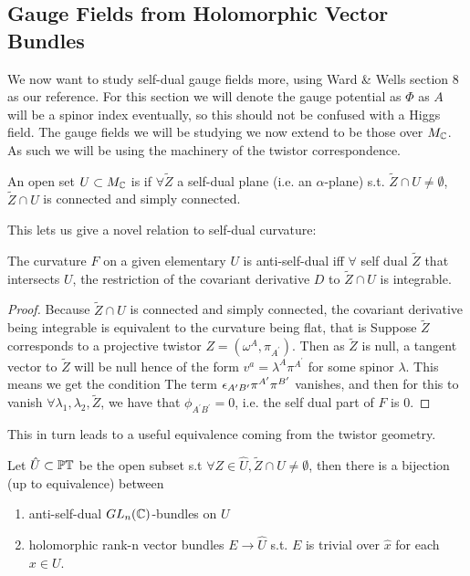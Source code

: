 \documentclass{article}
\begin{document}
\subsection{Gauge Fields from Holomorphic Vector Bundles}
We now want to study self-dual gauge fields more, using Ward \& Wells section 8 as our reference. For this section we will denote the gauge potential as $\Phi$ as $A$ will be a spinor index eventually, so this should not be confused with a Higgs field. The gauge fields we will be studying we now extend to be those over $M_{\mathbb{C}}$. As such we will be using the machinery of the twistor correspondence. 
\begin{definition}
	An open set $U \subset M_{\mathbb{C}}$ is  if $\forall \tilde{Z}$ a self-dual plane (i.e. an $\alpha$-plane) s.t. $\tilde{Z} \cap U \neq \emptyset$, $\tilde{Z} \cap U$ is connected and simply connected. 
\end{definition}
This lets us give a novel relation to self-dual curvature:
\begin{prop}
	The curvature $F$ on a given elementary $U$ is anti-self-dual iff $\forall$ self dual $\tilde{Z}$ that intersects $U$, the restriction of the covariant derivative $D$ to $\tilde{Z} \cap U$ is integrable. 
\end{prop}
\begin{proof}
	Because $\tilde{Z} \cap U$ is connected and simply connected, the covariant derivative being integrable is equivalent to the curvature being flat, that is 
Suppose $\tilde{Z}$ corresponds to a projective twistor $Z = (\omega^A, \pi_{A^\prime})$. Then as $\tilde{Z}$ is null, a tangent vector to $\tilde{Z}$ will be null hence of the form $v^a = \lambda^A \pi^{A^\prime}$ for some spinor $\lambda$. This means we get the condition 
The term $\epsilon_{A^\prime B^\prime}\pi^{A^\prime} \pi^{B^\prime}$ vanishes, and then for this to vanish $\forall \lambda_1, \lambda_2, \tilde{Z}$, we have that $\phi_{A^\prime B^\prime}=0$, i.e. the self dual part of $F$ is 0. 
\end{proof}
This in turn leads to a useful equivalence coming from the twistor geometry. 
\begin{theorem}
	Let $\hat{U} \subset \mathbb{PT}$ be the open subset s.t $\forall Z \in \hat{U}, \tilde{Z} \cap U \neq \emptyset$, then there is a bijection (up to equivalence) between
	\begin{enumerate}
		\item anti-self-dual $GL_n(\mathbb{C})$-bundles on $U$ 
		\item holomorphic rank-n vector bundles $E\to \hat{U}$ s.t. $E$ is trivial over $\hat{x}$ for each $x \in U$. 
	\end{enumerate}
\end{theorem}
\end{document}
